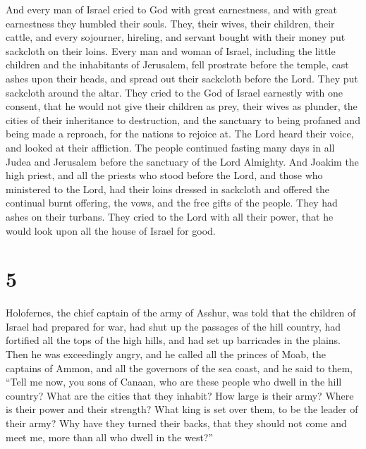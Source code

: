  And every man of Israel cried to God with great
earnestness, and with great earnestness they humbled their souls.
 They, their wives, their children, their cattle, and
every sojourner, hireling, and servant bought with their money put
sackcloth on their loins.  Every man and woman of Israel,
including the little children and the inhabitants of Jerusalem, fell
prostrate before the temple, cast ashes upon their heads, and spread out
their sackcloth before the Lord. They put sackcloth around the altar.
 They cried to the God of Israel earnestly with one
consent, that he would not give their children as prey, their wives as
plunder, the cities of their inheritance to destruction, and the
sanctuary to being profaned and being made a reproach, for the nations
to rejoice at.  The Lord heard their voice, and looked at
their affliction. The people continued fasting many days in all Judea
and Jerusalem before the sanctuary of the Lord Almighty. 
And Joakim the high priest, and all the priests who stood before the
Lord, and those who ministered to the Lord, had their loins dressed in
sackcloth and offered the continual burnt offering, the vows, and the
free gifts of the people.  They had ashes on their
turbans. They cried to the Lord with all their power, that he would look
upon all the house of Israel for good.

\hypertarget{section-4}{%
\section{5}\label{section-4}}

 Holofernes, the chief captain of the army of Asshur, was
told that the children of Israel had prepared for war, had shut up the
passages of the hill country, had fortified all the tops of the high
hills, and had set up barricades in the plains.  Then he
was exceedingly angry, and he called all the princes of Moab, the
captains of Ammon, and all the governors of the sea coast,
 and he said to them, ``Tell me now, you sons of Canaan,
who are these people who dwell in the hill country? What are the cities
that they inhabit? How large is their army? Where is their power and
their strength? What king is set over them, to be the leader of their
army?  Why have they turned their backs, that they should
not come and meet me, more than all who dwell in the west?''

